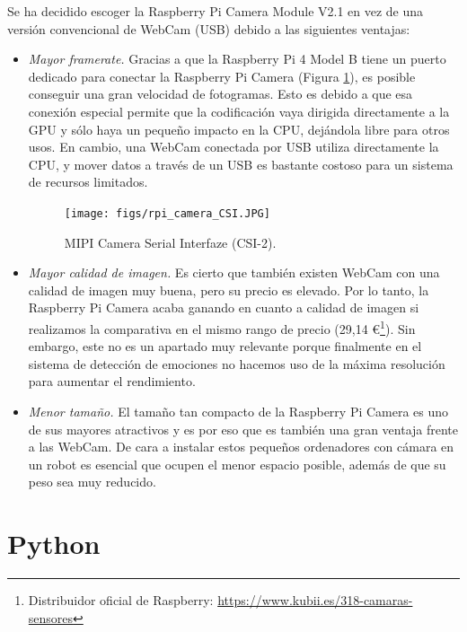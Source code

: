 Se ha decidido escoger la Raspberry Pi Camera Module V2.1 en vez de una versión convencional de WebCam (USB) debido a las siguientes ventajas:

\begin{itemize}
    \item \textit{Mayor framerate.} Gracias a que la Raspberry Pi 4 Model B tiene un puerto dedicado para conectar la Raspberry Pi Camera (Figura \ref{fig:rpi_camera_CSI}), es posible conseguir una gran velocidad de fotogramas. Esto es debido a que esa conexión especial permite que la codificación vaya dirigida directamente a la GPU y sólo haya un pequeño impacto en la CPU, dejándola libre para otros usos. En cambio, una WebCam conectada por USB utiliza directamente la CPU, y mover datos a través de un USB es bastante costoso para un sistema de recursos limitados.
    
    \begin{figure} [h!]
      \begin{center}
        \texttt{[image: figs/rpi\_camera\_CSI.JPG]}
      \end{center}
      \caption{MIPI Camera Serial Interfaze (CSI-2).}
      \label{fig:rpi_camera_CSI}
    \end{figure}
    
    \item \textit{Mayor calidad de imagen.} Es cierto que también existen WebCam con una calidad de imagen muy buena, pero su precio es elevado. Por lo tanto, la Raspberry Pi Camera acaba ganando en cuanto a calidad de imagen si realizamos la comparativa en el mismo rango de precio (29,14 \euro\footnote{Distribuidor oficial de Raspberry: \url{https://www.kubii.es/318-camaras-sensores}}). Sin embargo, este no es un apartado muy relevante porque finalmente en el sistema de detección de emociones no hacemos uso de la máxima resolución para aumentar el rendimiento.
    
    \item \textit{Menor tamaño.} El tamaño tan compacto de la Raspberry Pi Camera es uno de sus mayores atractivos y es por eso que es también una gran ventaja frente a las WebCam. De cara a instalar estos pequeños ordenadores con cámara en un robot es esencial que ocupen el menor espacio posible, además de que su peso sea muy reducido.
\end{itemize}

\section{Python}

